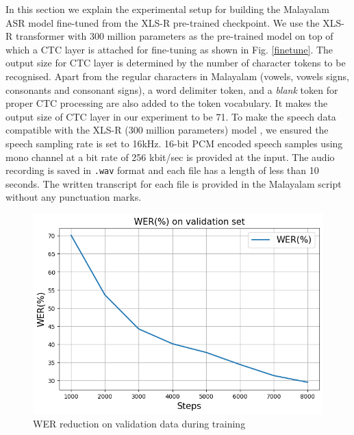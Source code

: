 \documentclass[runningheads]{llncs}
\begin{document}
In this section we explain the experimental setup for building the Malayalam ASR model fine-tuned from the XLS-R pre-trained checkpoint. We use the  XLS-R  transformer with 300 million parameters as the pre-trained model on top of which a CTC layer is attached for fine-tuning as shown in Fig. \ref{finetune}. The output size for CTC layer is determined by the number of character tokens to be recognised. Apart from the regular characters in Malayalam (vowels, vowels signs, consonants and consonant signs), a word delimiter token, and a \textit{blank} token for proper CTC processing are also added to the token vocabulary. It makes the output size of CTC layer in our experiment to be 71. To make the speech data compatible with the XLS-R (300 million parameters) model \cite{babu2021xls}, we ensured the speech sampling rate is set to 16kHz.  16-bit PCM encoded speech samples using mono channel at a bit rate of 256 kbit/sec is provided at the input. The audio recording is saved in \texttt{.wav} format and each file has a length of less than 10 seconds. The written transcript for each file is provided in the Malayalam script without any punctuation marks.







\begin{figure}[htpb]
    \centering
    \includegraphics[width=0.8\linewidth, height=0.5\linewidth]{wer-curve.png}
    \caption{WER reduction on validation data during training}
    \label{Fig:WER}

\end{figure}
\end{document}
